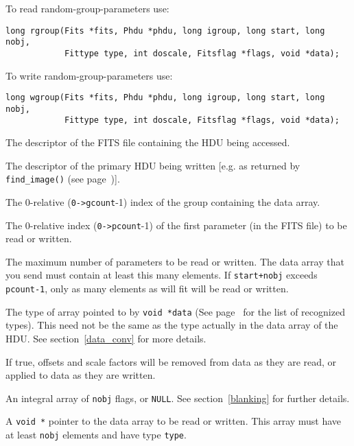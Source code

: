 To read random-group-parameters use:
\label{rgroup}\begin{verbatim}
long rgroup(Fits *fits, Phdu *phdu, long igroup, long start, long nobj,
            Fittype type, int doscale, Fitsflag *flags, void *data);
\end{verbatim}
To write random-group-parameters use:
\label{wgroup}\begin{verbatim}
long wgroup(Fits *fits, Phdu *phdu, long igroup, long start, long nobj,
            Fittype type, int doscale, Fitsflag *flags, void *data);
\end{verbatim}
\begin{arglist}
 The descriptor of the FITS file containing the HDU being
             accessed.
 
 The descriptor of the primary HDU being written
             [e.g. as returned by \verb`find_image()` (see
             page~\pageref{find_image})]. 

 The 0-relative (\verb`0->gcount`-1) index of the group
             containing the data array. 
 
 The 0-relative index (\verb`0->pcount`-1) of the
             first parameter (in the FITS file) to be read or written.

 The maximum number of parameters to be read or written.
             The data array that you send must contain at least this
             many elements. If \verb`start+nobj` exceeds
             \verb`pcount-1`, only as many elements as will fit will
             be read or written.

 The type of array pointed to by \verb`void *data`
             (See page~\pageref{Fittype} for the list of
             recognized types). This need not
             be the same as the type actually in the data array of the
             HDU. See section~\ref{data_conv} for more details.

 If true, offsets and scale factors will be removed from
             data as they are read, or applied to data as they are written.

 An integral array of \verb`nobj` flags, or \verb`NULL`. See
             section~\ref{blanking} for further details.

 A \verb`void *` pointer to the data array to be
             read or written. This array must have at least \verb`nobj`
             elements and have type \verb`type`.
\end{arglist}

